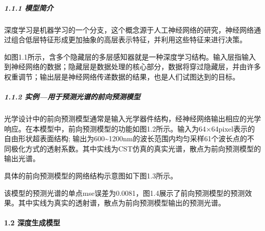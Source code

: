 \documentclass[letterpaper,10pt,english]{sphinxmanual}
\begin{document}
\subparagraph{1.1.1 模型简介}
\label{\detokenize{_u7b80_u4ecb/_u6838_u5fc3_u8bbe_u8ba1_u4f18_u5316_u7b97_u6cd5/_u6df1_u5ea6_u5b66_u4e60_u6a21_u5757/_u6df1_u5ea6_u5b66_u4e60_u6a21_u578b:id4}}
\sphinxAtStartPar
深度学习是机器学习的一个分支，这个概念源于人工神经网络的研究，神经网络通过组合低层特征形成更加抽象的高层表示特征，并利用这些特征来进行决策。


\sphinxAtStartPar
{}





\sphinxAtStartPar
如图1.1所示，含多个隐藏层的多层感知器就是一种深度学习结构。输入层指输入到神经网络的数据；隐藏层是数据处理的核心部分，数据将穿过隐藏层，并由许多权重调节；输出层是神经网络传递数据的结果，也是人们试图达到的目标。


\subparagraph{1.1.2 实例—用于预测光谱的前向预测模型}
\label{\detokenize{_u7b80_u4ecb/_u6838_u5fc3_u8bbe_u8ba1_u4f18_u5316_u7b97_u6cd5/_u6df1_u5ea6_u5b66_u4e60_u6a21_u5757/_u6df1_u5ea6_u5b66_u4e60_u6a21_u578b:id5}}
\sphinxAtStartPar


\sphinxAtStartPar
{}





\sphinxAtStartPar
光学设计中的前向预测模型通常是输入光学器件结构，经神经网络输出相应的光学响应。在本模型中，前向预测模型的功能如图1.2所示。输入为64×64pixel表示的自由形状超表面结构; 输出为600\textasciitilde{}1200nm的波长范围内均匀采样61个波长点的不同极化方式的透射系数。其中实线为CST仿真的真实光谱，散点为前向预测模型的输出光谱。

\sphinxAtStartPar
具体的前向预测模型的网络结构示意图如下图1.3所示。


\sphinxAtStartPar
{}





\sphinxAtStartPar
{}





\sphinxAtStartPar
该模型的预测光谱的单点mse误差为0.0081，图1.4展示了前向预测模型的预测效果。其中实线为真实的透射谱，散点为前向预测模型输出的预测光谱。


\paragraph{1.2 深度生成模型}
\label{\detokenize{_u7b80_u4ecb/_u6838_u5fc3_u8bbe_u8ba1_u4f18_u5316_u7b97_u6cd5/_u6df1_u5ea6_u5b66_u4e60_u6a21_u5757/_u6df1_u5ea6_u5b66_u4e60_u6a21_u578b:id6}}
\end{document}
